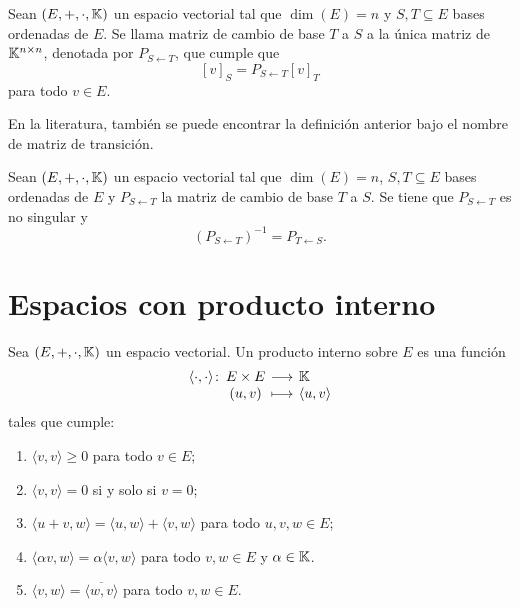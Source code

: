 \documentclass[a4,11pt]{aleph-notas}
\begin{document}
\begin{defi}
    Sean $(E,+,\cdot,\K)$ un espacio vectorial tal que $\dim(E)=n$ y $S,T\subseteq E$ bases ordenadas de $E$. Se llama matriz de cambio de base $T$ a $S$ a la única matriz de $\Mat[\K]{n}{n}$, denotada por $P_{S\gets T}$, que cumple que
    \[
        [v]_S = P_{S\gets T} [v]_T
    \]
    para todo $v\in E$.
\end{defi}

\begin{advertencia}
    En la literatura, también se puede encontrar la definición anterior bajo el nombre de matriz de transición.
\end{advertencia}


\begin{teo}
    Sean $(E,+,\cdot,\K)$ un espacio vectorial tal que $\dim(E)=n$, $S,T\subseteq E$ bases ordenadas de $E$ y $P_{S\gets T}$ la matriz de cambio de base $T$ a $S$. Se tiene que $P_{S\gets T}$ es no singular y
    \[
        (P_{S\gets T})^{-1} = P_{T\gets S}.
    \]
\end{teo}


\section{Espacios con producto interno}

\begin{defi}
    Sea $(E,+,\cdot,\K)$ un espacio vectorial. Un producto interno sobre $E$ es una función
    \[
        \funcion{\langle \cdot, \cdot \rangle}{E\times E}{\K}{(u,v)}{\langle u, v \rangle}
    \]
    tales que cumple:
    \begin{enumerate}
        \item 
            $\langle v, v \rangle \geq 0$ para todo $ v \in E$;
        \item 
            $\langle v,v \rangle = 0$ si y solo si $ v = 0$;
        \item 
            $\langle u + v, w \rangle = \langle u,w \rangle + \langle v,w\rangle $ para todo $u,v,w \in E$;
        \item
            $\langle \alpha v,w \rangle = \alpha \langle v,w \rangle$ para todo $v,w \in E$ y $\alpha\in\K$.
        \item
            $\langle v,w \rangle = \overline{\langle w, v \rangle}$ para todo $v,w \in E$.
    \end{enumerate}
\end{defi}
\end{document}
